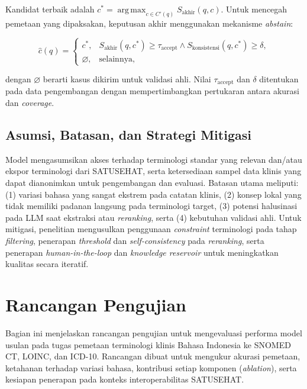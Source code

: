 Kandidat terbaik adalah $c^*=\operatorname*{arg\,max}_{c\in C'(q)}S_{\mathrm{akhir}}(q,c)$. Untuk mencegah pemetaan yang dipaksakan, keputusan akhir menggunakan mekanisme \textit{abstain}:

\begin{equation}
\widehat{c}(q)=
\begin{cases}
c^*, & S_{\mathrm{akhir}}(q,c^*)\geq\tau_{\mathrm{accept}}
\land S_{\mathrm{konsistensi}}(q,c^*)\geq\delta,\\
\varnothing, & \text{selainnya},
\end{cases}
\label{eq:acceptance-decision}
\end{equation}

dengan $\varnothing$ berarti kasus dikirim untuk validasi ahli. Nilai $\tau_{\mathrm{accept}}$ dan $\delta$ ditentukan pada data pengembangan dengan mempertimbangkan pertukaran antara akurasi dan \textit{coverage}.


\subsection{Asumsi, Batasan, dan Strategi Mitigasi}

Model mengasumsikan akses terhadap terminologi standar yang relevan dan/atau ekspor terminologi dari SATUSEHAT, serta ketersediaan sampel data klinis yang dapat dianonimkan untuk pengembangan dan evaluasi. Batasan utama meliputi: (1) variasi bahasa yang sangat ekstrem pada catatan klinis, (2) konsep lokal yang tidak memiliki padanan langsung pada terminologi target, (3) potensi halusinasi pada LLM saat ekstraksi atau \textit{reranking}, serta (4) kebutuhan validasi ahli. Untuk mitigasi, penelitian mengusulkan penggunaan \textit{constraint} terminologi pada tahap \textit{filtering}, penerapan \textit{threshold} dan \textit{self-consistency} pada \textit{reranking}, serta penerapan \textit{human-in-the-loop} dan \textit{knowledge reservoir} untuk meningkatkan kualitas secara iteratif.

\section{Rancangan Pengujian}

Bagian ini menjelaskan rancangan pengujian untuk mengevaluasi performa model usulan pada tugas pemetaan terminologi klinis Bahasa Indonesia ke SNOMED CT, LOINC, dan ICD-10. Rancangan dibuat untuk mengukur akurasi pemetaan, ketahanan terhadap variasi bahasa, kontribusi setiap komponen (\textit{ablation}), serta kesiapan penerapan pada konteks interoperabilitas SATUSEHAT.

